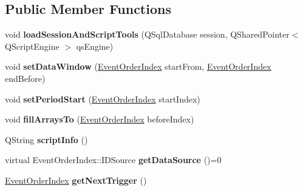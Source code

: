 \subsection*{Public Member Functions}
\begin{DoxyCompactItemize}
\item 
\hypertarget{class_picto_1_1_analysis_trigger_a2106eb2bc97e9dbe7b37b963392ec584}{void {\bfseries load\-Session\-And\-Script\-Tools} (Q\-Sql\-Database session, Q\-Shared\-Pointer$<$ Q\-Script\-Engine $>$ qs\-Engine)}\label{class_picto_1_1_analysis_trigger_a2106eb2bc97e9dbe7b37b963392ec584}

\item 
\hypertarget{class_picto_1_1_analysis_trigger_af000e06fdfd4651ff5a5dff1abd8df9b}{void {\bfseries set\-Data\-Window} (\hyperlink{class_picto_1_1_event_order_index}{Event\-Order\-Index} start\-From, \hyperlink{class_picto_1_1_event_order_index}{Event\-Order\-Index} end\-Before)}\label{class_picto_1_1_analysis_trigger_af000e06fdfd4651ff5a5dff1abd8df9b}

\item 
\hypertarget{class_picto_1_1_analysis_trigger_a165704f3f28ab98ecc61994d8d977b50}{void {\bfseries set\-Period\-Start} (\hyperlink{class_picto_1_1_event_order_index}{Event\-Order\-Index} start\-Index)}\label{class_picto_1_1_analysis_trigger_a165704f3f28ab98ecc61994d8d977b50}

\item 
\hypertarget{class_picto_1_1_analysis_trigger_aeb75db3cdfec529e4959e48a07c23acd}{void {\bfseries fill\-Arrays\-To} (\hyperlink{class_picto_1_1_event_order_index}{Event\-Order\-Index} before\-Index)}\label{class_picto_1_1_analysis_trigger_aeb75db3cdfec529e4959e48a07c23acd}

\item 
\hypertarget{class_picto_1_1_analysis_trigger_aef9f108ae2db1e063e0918b8967dcd4d}{Q\-String {\bfseries script\-Info} ()}\label{class_picto_1_1_analysis_trigger_aef9f108ae2db1e063e0918b8967dcd4d}

\item 
\hypertarget{class_picto_1_1_analysis_trigger_a7dec161134c752cfa32d2db4e0d3987d}{virtual Event\-Order\-Index\-::\-I\-D\-Source {\bfseries get\-Data\-Source} ()=0}\label{class_picto_1_1_analysis_trigger_a7dec161134c752cfa32d2db4e0d3987d}

\item 
\hypertarget{class_picto_1_1_analysis_trigger_a703f00429c84412a29e2068dd04f3c15}{\hyperlink{class_picto_1_1_event_order_index}{Event\-Order\-Index} {\bfseries get\-Next\-Trigger} ()}\label{class_picto_1_1_analysis_trigger_a703f00429c84412a29e2068dd04f3c15}


\end{DoxyCompactItemize}
